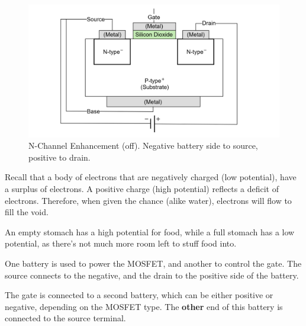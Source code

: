 \vspace{-1em}
\begin{figure}[ht!]
  \centering
  \includegraphics[width=.91\textwidth]{Sections/circuits/mosfet.png}
  \caption{N-Channel Enhancement (off). Negative battery side to source, positive to drain.}
  \label{fig:mosfet}
\end{figure}

\newpage

\begin{theo}

  \label{theo:flow_of_electrons}

  Recall that a body of electrons that are negatively charged (low potential), have a surplus of electrons.
  A positive charge (high potential) reflects a deficit of electrons. Therefore, when given the chance
  (alike water), electrons will flow to fill the void.
\end{theo}

\begin{Tip} An empty stomach has a high potential for food, while a full stomach has a low potential,
  as there's not much more room left to stuff food into.
\end{Tip}

\begin{Def}

    \label{def:mosfet_gate_interaction}

    One battery is used to power the MOSFET, and another to control the gate.
    The source connects to the negative, and the drain to the positive side of the battery.
    
    The gate is connected to a second battery, which can be either positive or negative, depending on the MOSFET type.
    The \textbf{other} end of this battery is connected to the source terminal.
\end{Def}

